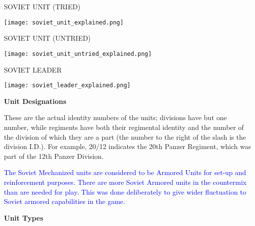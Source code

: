 SOVIET UNIT (TRIED)

\begin{center}
  \texttt{[image: soviet\_unit\_explained.png]}
\end{center}

SOVIET UNIT (UNTRIED)

\begin{center}
  \texttt{[image: soviet\_unit\_untried\_explained.png]}
\end{center}

SOVIET LEADER

\begin{center}
  \texttt{[image: soviet\_leader\_explained.png]}
\end{center}

\textbf{Unit Designations}

These are the actual identity numbers of the units; divisions have but one number, while regiments have both their regimental identity and the number of the division of which they are a part (the number to the right of the slash is the division I.D.). For example, 20/12 indicates the 20th Panzer Regiment, which was part of the 12th Panzer Division.

\textcolor{blue}{The Soviet Mechanized units are considered to be Armored Units for set-up and reinforcement purposes. There are more Soviet Armored units in the countermix than are needed for play. This was done deliberately to give wider fluctuation to Soviet armored capabilities in the game.}

\textbf{Unit Types}





